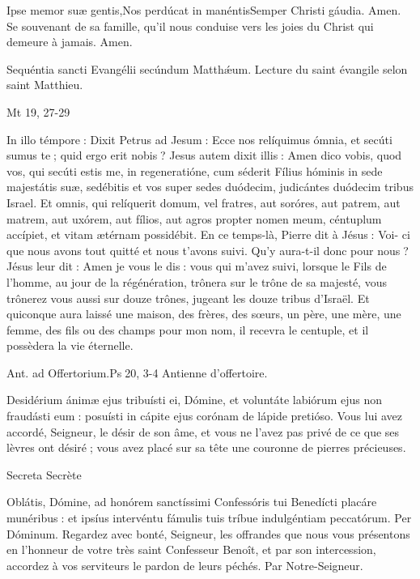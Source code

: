 \begin{paracol}{2}
Ipse memor suæ gentis,Nos perdúcat in manéntisSemper Christi gáudia. Amen.
\switchcolumn
Se souvenant de sa famille, qu’il nous conduise vers les joies du Christ qui demeure à jamais. Amen.
\switchcolumn*

Sequéntia sancti Evangélii secúndum Matthǽum.
\switchcolumn
Lecture du saint évangile selon saint Matthieu.
\switchcolumn*

Mt 19, 27-29
\switchcolumn

\switchcolumn*

In illo témpore : Dixit Petrus ad  Jesum : Ecce nos relíquimus ómnia, et secúti sumus te ; quid ergo erit nobis ? Jesus autem dixit illis : Amen dico vobis, quod vos, qui secúti estis me, in regeneratióne, cum séderit Fílius hóminis in sede majestátis suæ, sedébitis et vos super sedes duódecim, judicántes duódecim tribus Israel. Et omnis, qui relíquerit domum, vel fratres, aut soróres, aut patrem, aut matrem, aut uxórem, aut fílios, aut agros propter nomen meum, céntuplum accípiet, et vitam ætérnam possidébit.
\switchcolumn
En ce temps-là, Pierre dit à Jésus : Voi- ci que nous avons tout quitté et nous t’avons suivi. Qu’y aura-t-il donc pour nous ? Jésus leur dit : Amen je vous le dis : vous qui m’avez suivi, lorsque le Fils de l’homme, au jour de la régénération, trônera sur le trône de sa majesté, vous trônerez vous aussi sur douze trônes, jugeant les douze tribus d’Israël. Et quiconque aura laissé une maison, des frères, des sœurs, un père, une mère, une femme, des fils ou des champs pour mon nom, il recevra le centuple, et il possèdera la vie éternelle.
\switchcolumn*

Ant. ad Offertorium.\hfill Ps 20, 3-4
\switchcolumn
Antienne d’offertoire.
\switchcolumn*

Desidérium ánimæ ejus tribuísti ei, Dómine, et voluntáte labiórum ejus non fraudásti eum : posuísti in cápite ejus corónam de lápide pretióso.
\switchcolumn
Vous lui avez accordé, Seigneur, le désir de son âme, et vous ne l’avez pas privé de ce que ses lèvres ont désiré ; vous avez placé sur sa tête une couronne de pierres précieuses.
\switchcolumn*

Secreta
\switchcolumn
Secrète
\switchcolumn*

Oblátis, Dómine, ad honórem  sanctíssimi Confessóris tui Benedícti placáre munéribus : et ipsíus intervéntu fámulis tuis tríbue indulgéntiam peccatórum. Per Dóminum.
\switchcolumn
Regardez avec bonté, Seigneur, les offrandes que nous vous présentons en l’honneur de votre très saint Confesseur Benoît, et par son intercession, accordez à vos serviteurs le pardon de leurs péchés. Par Notre-Seigneur.
\switchcolumn*


\end{paracol}
